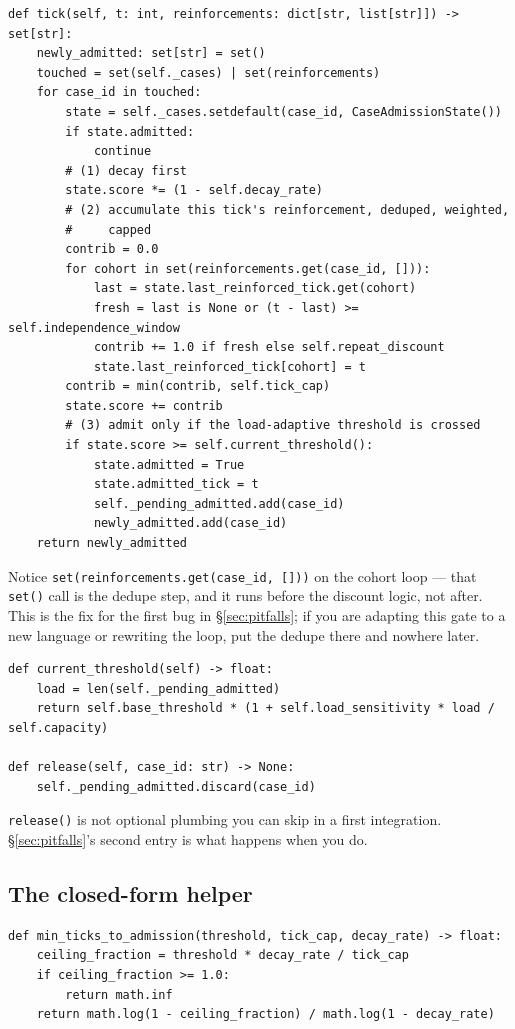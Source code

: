 \documentclass[11pt]{article}
\begin{document}
\begin{lstlisting}
def tick(self, t: int, reinforcements: dict[str, list[str]]) -> set[str]:
    newly_admitted: set[str] = set()
    touched = set(self._cases) | set(reinforcements)
    for case_id in touched:
        state = self._cases.setdefault(case_id, CaseAdmissionState())
        if state.admitted:
            continue
        # (1) decay first
        state.score *= (1 - self.decay_rate)
        # (2) accumulate this tick's reinforcement, deduped, weighted,
        #     capped
        contrib = 0.0
        for cohort in set(reinforcements.get(case_id, [])):
            last = state.last_reinforced_tick.get(cohort)
            fresh = last is None or (t - last) >= self.independence_window
            contrib += 1.0 if fresh else self.repeat_discount
            state.last_reinforced_tick[cohort] = t
        contrib = min(contrib, self.tick_cap)
        state.score += contrib
        # (3) admit only if the load-adaptive threshold is crossed
        if state.score >= self.current_threshold():
            state.admitted = True
            state.admitted_tick = t
            self._pending_admitted.add(case_id)
            newly_admitted.add(case_id)
    return newly_admitted
\end{lstlisting}

Notice \texttt{set(reinforcements.get(case\_id, []))} on the cohort loop
--- that \texttt{set()} call is the dedupe step, and it runs before the
discount logic, not after. This is the fix for the first bug in
\S\ref{sec:pitfalls}; if you are adapting this gate to a new language or
rewriting the loop, put the dedupe there and nowhere later.

\begin{lstlisting}
def current_threshold(self) -> float:
    load = len(self._pending_admitted)
    return self.base_threshold * (1 + self.load_sensitivity * load / self.capacity)

def release(self, case_id: str) -> None:
    self._pending_admitted.discard(case_id)
\end{lstlisting}

\texttt{release()} is not optional plumbing you can skip in a first
integration. \S\ref{sec:pitfalls}'s second entry is what happens when you
do.

\subsection{The closed-form helper}

\begin{lstlisting}
def min_ticks_to_admission(threshold, tick_cap, decay_rate) -> float:
    ceiling_fraction = threshold * decay_rate / tick_cap
    if ceiling_fraction >= 1.0:
        return math.inf
    return math.log(1 - ceiling_fraction) / math.log(1 - decay_rate)
\end{lstlisting}
\end{document}
